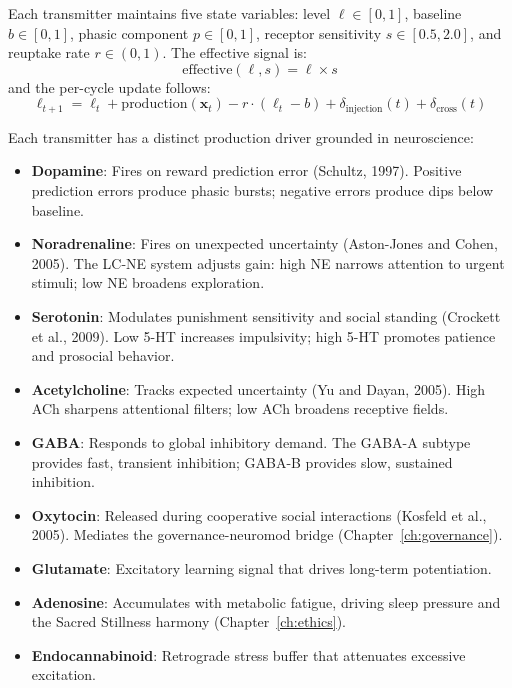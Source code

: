 \documentclass[12pt]{book}
\begin{document}
Each transmitter maintains five state variables: level $\ell \in [0,1]$, baseline $b \in [0,1]$, phasic component $p \in [0,1]$, receptor sensitivity $s \in [0.5, 2.0]$, and reuptake rate $r \in (0,1)$. The effective signal is:
\begin{equation}\label{eq:effective-signal}
\text{effective}(\ell, s) = \ell \times s
\end{equation}
and the per-cycle update follows:
\begin{equation}\label{eq:transmitter-update}
\ell_{t+1} = \ell_t + \text{production}(\mathbf{x}_t) - r \cdot (\ell_t - b) + \delta_{\text{injection}}(t) + \delta_{\text{cross}}(t)
\end{equation}

Each transmitter has a distinct production driver grounded in neuroscience:
\begin{itemize}
  \item \textbf{Dopamine}: Fires on reward prediction error (Schultz, 1997). Positive prediction errors produce phasic bursts; negative errors produce dips below baseline.
  \item \textbf{Noradrenaline}: Fires on unexpected uncertainty (Aston-Jones and Cohen, 2005). The LC-NE system adjusts gain: high NE narrows attention to urgent stimuli; low NE broadens exploration.
  \item \textbf{Serotonin}: Modulates punishment sensitivity and social standing (Crockett et al., 2009). Low 5-HT increases impulsivity; high 5-HT promotes patience and prosocial behavior.
  \item \textbf{Acetylcholine}: Tracks expected uncertainty (Yu and Dayan, 2005). High ACh sharpens attentional filters; low ACh broadens receptive fields.
  \item \textbf{GABA}: Responds to global inhibitory demand. The GABA-A subtype provides fast, transient inhibition; GABA-B provides slow, sustained inhibition.
  \item \textbf{Oxytocin}: Released during cooperative social interactions (Kosfeld et al., 2005). Mediates the governance-neuromod bridge (Chapter~\ref{ch:governance}).
  \item \textbf{Glutamate}: Excitatory learning signal that drives long-term potentiation.
  \item \textbf{Adenosine}: Accumulates with metabolic fatigue, driving sleep pressure and the Sacred Stillness harmony (Chapter~\ref{ch:ethics}).
  \item \textbf{Endocannabinoid}: Retrograde stress buffer that attenuates excessive excitation.
\end{itemize}
\end{document}
